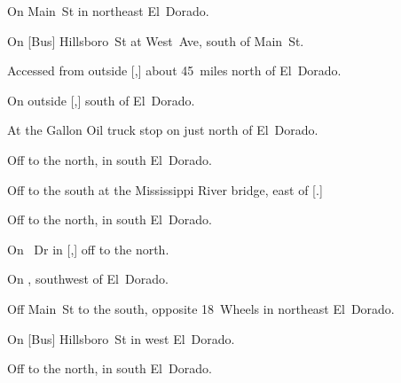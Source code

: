 
\begin{LocationList}

On  Main~St in northeast El~Dorado.

On [Bus] Hillsboro~St at West~Ave, south of Main~St.

Accessed from  outside [,] about 45~miles north of El~Dorado.

On   outside [,] south of El~Dorado.

At the Gallon Oil truck stop on  just north of El~Dorado.

\Location{\GarageHQ \Garage}
Off   to the north, in south El~Dorado.

Off  to the south at the Mississippi River bridge, east of [.]

Off   to the north, in south El~Dorado.

On \MLKing~Dr in [,] off  to the north.

On , southwest of El~Dorado.

Off  Main~St to the south, opposite 18~Wheels in northeast El~Dorado.

On [Bus] Hillsboro~St in west El~Dorado.

Off   to the north, in south El~Dorado.

\end{LocationList}
